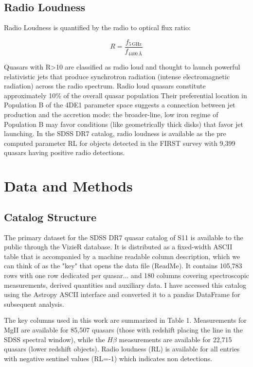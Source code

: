 \documentclass[11pt,a4paper]{article}
\begin{document}
\subsection{Radio Loudness}
Radio Loudness is quantified by the radio to optical flux ratio:

$$R = \frac{f_{5\,\text{GHz}}}{f_{4400\,\text{Å}}}$$

Quasars with R>10 are classified as radio loud and thought to launch powerful relativistic jets that produce synchrotron radiation (intense electromagnetic radiation) across the radio spectrum. Radio loud quasars constitute approximately 10\% of the overall quasar population Their preferential location in Population B of the 4DE1 parameter space suggests a connection between jet production and the accretion mode: the broader-line, low iron regime of Population B may favor conditions (like geometrically thick disks) that favor jet launching. In the SDSS DR7 catalog, radio loudness is available as the pre computed parameter RL for objects detected in the FIRST survey with 9,399 quasars having positive radio detections.

\section{Data and Methods}
\subsection{Catalog Structure}
The primary dataset for the SDSS DR7 quasar catalog of S11 is available to the public through the VizieR database. It is distributed as a fixed-width ASCII table that is accompanied by a machine readable column description, which we can think of as the "key" that opens the data file (ReadMe). It contains 105,783 rows with one row dedicated per quasar... and 180 columns covering spectroscopic measurements, derived quantities and auxiliary data. I have accessed this catalog using the Astropy ASCII interface and converted it to a pandas DataFrame for subsequent analysis. 

The key columns used in this work are summarized in Table 1. Measurements for MgII are available for 85,507 quasars (those with redshift placing the line in the SDSS spectral window), while the $H \beta$ measurements are available for 22,715 quasars (lower redshift objects). Radio loudness (RL) is available for all entries with negative sentinel values (RL=-1) which indicates non detections.
\end{document}
